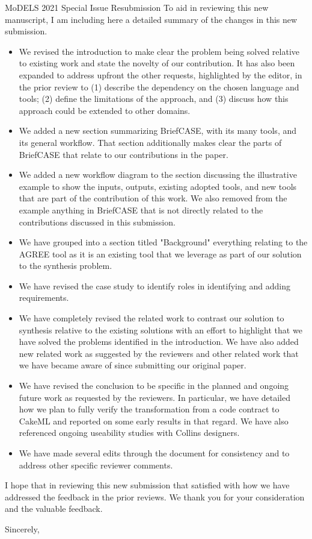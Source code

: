 \documentclass[10pt]{byu-cs}
\begin{document}
\begin{letter}{MoDELS 2021 Special Issue Resubmission}
To aid in reviewing this new manuscript, I am including here a detailed summary of the changes in this new submission.
\begin{itemize}
  \item We revised the introduction to make clear the problem being solved relative to existing work and state the novelty of our contribution. It has also been expanded to address upfront the other requests, highlighted by the editor, in the prior review to (1) describe the dependency on the chosen language and tools; (2) define the limitations of the approach, and (3) discuss how this approach could be extended to other domains.
  \item We added a new section summarizing BriefCASE, with its many tools, and its general workflow. That section additionally makes clear the parts of BriefCASE that relate to our contributions in the paper.
  \item We added a new workflow diagram to the section discussing the illustrative example to show the inputs, outputs, existing adopted tools, and new tools that are part of the contribution of this work. We also removed from the example anything in BriefCASE that is not directly related to the contributions discussed in this submission.
  \item We have grouped into a section titled "Background" everything relating to the AGREE tool as it is an existing tool that we leverage as part of our solution to the synthesis problem.
  \item We have revised the case study to identify roles in identifying and adding requirements.
  \item We have completely revised the related work to contrast our solution to synthesis relative to the existing solutions with an effort to highlight that we have solved the problems identified in the introduction. We have also added new related work as suggested by the reviewers and other related work that we have became aware of since submitting our original paper.
  \item We have revised the conclusion to be specific in the planned and ongoing future work as requested by the reviewers. In particular, we have detailed how we plan to fully verify the transformation from a code contract to CakeML and reported on some early results in that regard. We have also referenced ongoing useability studies with Collins designers.
  \item We have made several edits through the document for consistency and to address other specific reviewer comments.
\end{itemize}

I hope that in reviewing this new submission that satisfied with how we have addressed the feedback in the prior reviews.
We thank you for your consideration and the valuable feedback.

\closing{Sincerely,}

\end{letter}
\end{document}
